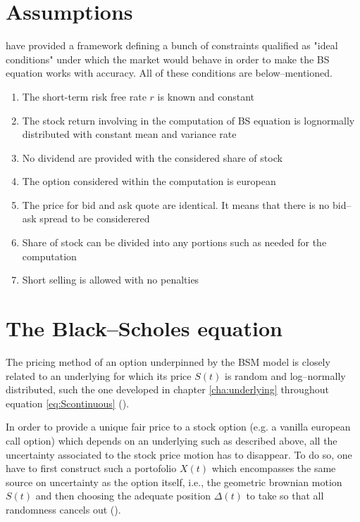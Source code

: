 \documentclass[12pt]{report}
\newcommand{\St}{S\left(t\right)}
\begin{document}
\section{Assumptions}
\label{sec:Assumptions}

\citet{bs} have provided a framework defining a bunch of constraints qualified as "ideal conditions" under which the market would behave in order to make the BS equation works with accuracy. All of these conditions are below--mentioned.

\begin{enumerate}
  \item The short-term risk free rate $r$ is known and constant
  \item The stock return involving in the computation of BS equation is lognormally distributed with constant mean and variance rate
  \item No dividend are provided with the considered share of stock
  \item The option considered within the computation is european
  \item The price for bid and ask quote are identical. It means that there is no bid--ask spread to be considerered
  \item Share of stock can be divided into any portions such as needed for the computation
  \item Short selling is allowed with no penalties
\end{enumerate}


\section{The Black--Scholes equation}
\label{sec:BSequation}

The pricing method of an option underpinned by the BSM model is closely related to an underlying for which its price $\St$ is random and log--normally distributed, such the one developed in chapter \ref{cha:underlying} throughout equation \ref{eq:Scontinuous} (\citet{bs}).

In order to provide a unique fair price to a stock option (e.g. a vanilla european call option) which depends on an underlying such as described above, all the uncertainty associated to the stock price motion has to disappear. To do so, one have to first construct such a portofolio $X(t)$ which encompasses the same source on uncertainty as the option itself, i.e., the geometric brownian motion $\St$ and then choosing the adequate position $\Delta(t)$ to take  so that all randomness cancels out (\citet{shreve}).
 
\end{document}
